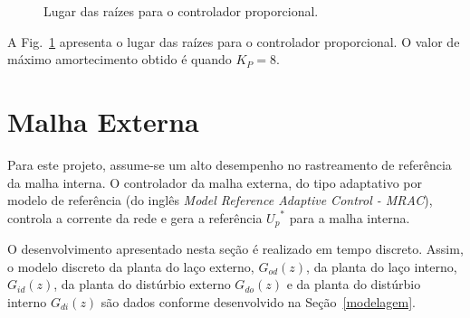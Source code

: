   \begin{figure}[htb]
    \centering{
      \def\svgwidth{\textwidth}
      }
    \renewcommand\figurename{Fig.}
    \caption{Lugar das raízes para o controlador proporcional.}
    \label{fig:rlocus_ic_2}
  \end{figure}

  A Fig.~\ref{fig:rlocus_ic_2} apresenta o lugar das raízes para o controlador proporcional. O valor de máximo amortecimento obtido é quando $K_P = 8$.


\section{Malha Externa}

  Para este projeto, assume-se um alto desempenho no rastreamento de referência da malha interna. O controlador da malha externa, do tipo adaptativo por modelo de referência (do inglês \emph{Model Reference Adaptive Control - MRAC}), controla a corrente da rede e gera a referência ${U_p}^*$ para a malha interna.

  O desenvolvimento apresentado nesta seção é realizado em tempo discreto. Assim, o modelo discreto da planta do laço externo, $G_{od}(z)$, da planta do laço interno, $G_{id}(z)$, da planta do distúrbio externo $G_{do}(z)$ e da planta do distúrbio interno $G_{di}(z)$ são dados conforme desenvolvido na Seção~\ref{modelagem}.


